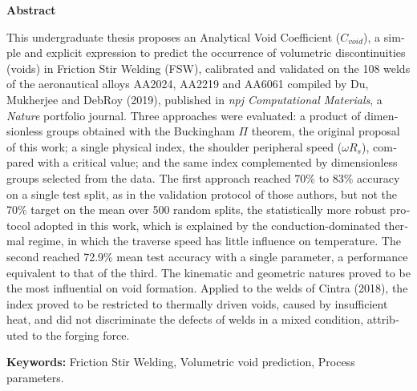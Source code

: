 \documentclass[12pt,openany]{report}
\begin{document}
\begin{center}
    {\fontsize{18}{22}\selectfont\bfseries Abstract\par}
\end{center}

\vspace{1.8cm}

\begin{otherlanguage}{english}
This undergraduate thesis proposes an Analytical Void Coefficient ($C_{void}$), a simple and explicit expression to predict the occurrence of volumetric discontinuities (voids) in Friction Stir Welding (FSW), calibrated and validated on the 108 welds of the aeronautical alloys AA2024, AA2219 and AA6061 compiled by Du, Mukherjee and DebRoy (2019), published in \textit{npj Computational Materials}, a \textit{Nature} portfolio journal. Three approaches were evaluated: a product of dimensionless groups obtained with the Buckingham $\Pi$ theorem, the original proposal of this work; a single physical index, the shoulder peripheral speed ($\omega R_s$), compared with a critical value; and the same index complemented by dimensionless groups selected from the data. The first approach reached 70\% to 83\% accuracy on a single test split, as in the validation protocol of those authors, but not the 70\% target on the mean over 500 random splits, the statistically more robust protocol adopted in this work, which is explained by the conduction-dominated thermal regime, in which the traverse speed has little influence on temperature. The second reached 72.9\% mean test accuracy with a single parameter, a performance equivalent to that of the third. The kinematic and geometric natures proved to be the most influential on void formation. Applied to the welds of Cintra (2018), the index proved to be restricted to thermally driven voids, caused by insufficient heat, and did not discriminate the defects of welds in a mixed condition, attributed to the forging force.

\vspace{1.0cm}
\noindent \textbf{Keywords:} Friction Stir Welding, Volumetric void prediction, Process parameters.
\end{otherlanguage}

\newpage
\end{document}
